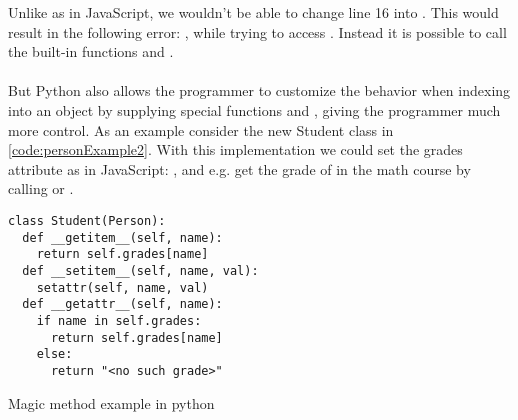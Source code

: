 Unlike as in JavaScript, we wouldn't be able to change line 16 into . This would result in the following error: , while trying to access . Instead it is possible to call the built-in functions  and . \\
\\
But Python also allows the programmer to customize the behavior when indexing into an object by supplying special functions  and , giving the programmer much more control. As an example consider the new Student class in \ref{code:personExample2}. With this implementation we could set the grades attribute as in JavaScript: , and e.g. get the grade of  in the math course by calling  or .

\begin{listing}[H]
\begin{verbatim}
class Student(Person):
  def __getitem__(self, name):
    return self.grades[name]
  def __setitem__(self, name, val):
    setattr(self, name, val)
  def __getattr__(self, name):
    if name in self.grades:
      return self.grades[name]
    else:
      return "<no such grade>"
\end{verbatim}
	\caption{Magic method example in python}
	\label{code:personExample2}
\end{listing}